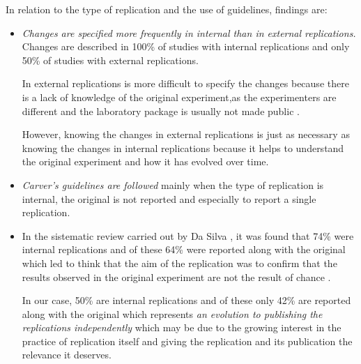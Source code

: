 In relation to the type of replication and the use of guidelines, findings are:
 
 \begin{itemize}
    \item \emph{Changes are specified more frequently in internal than in external replications.} 
    Changes are described in 100\% of studies with internal replications and only 50\% of studies with external replications. 
    
    In external replications is more difficult to specify the changes because there is a lack of knowledge of the original experiment,as the experimenters are different and the laboratory package is usually not made public \cite{santos2018analyzing}.
    
    However, knowing the changes in external replications is just as necessary as knowing the changes in internal replications because it helps to understand the original experiment and how it has evolved over time.
    
    \item \emph{Carver's guidelines are followed} mainly when the type of replication is internal, the original is not reported and especially to report a single replication.
    
    \item In the sistematic review carried out by Da Silva \etal \cite{da2014replication}, it was found that 74\% were internal replications and of these 64\% were reported along with the original which led to think that the aim of the replication was to confirm that the results observed in the original experiment are not the result of chance \cite{carver2014replications}.
    
    In our case, 50\% are internal replications and of these only 42\% are reported along with the original which represents \emph{an evolution to publishing the replications independently} which may be due to the growing interest in the practice of replication itself and giving the replication and its publication the relevance it deserves.
     

\end{itemize}

